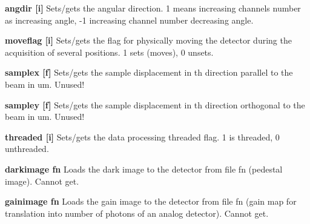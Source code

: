 \begin{DoxyItemize}
\item {\bfseries angdir \mbox{[}i\mbox{]}} Sets/gets the angular direction. 1 means increasing channels number as increasing angle, -\/1 increasing channel number decreasing angle.
\end{DoxyItemize}


\begin{DoxyItemize}
\item {\bfseries moveflag \mbox{[}i\mbox{]}} Sets/gets the flag for physically moving the detector during the acquisition of several positions. 1 sets (moves), 0 unsets.
\end{DoxyItemize}


\begin{DoxyItemize}
\item {\bfseries samplex \mbox{[}f\mbox{]}} Sets/gets the sample displacement in th direction parallel to the beam in um. Unused!
\end{DoxyItemize}


\begin{DoxyItemize}
\item {\bfseries sampley \mbox{[}f\mbox{]}} Sets/gets the sample displacement in th direction orthogonal to the beam in um. Unused!
\end{DoxyItemize}


\begin{DoxyItemize}
\item {\bfseries threaded \mbox{[}i\mbox{]}} Sets/gets the data processing threaded flag. 1 is threaded, 0 unthreaded.
\end{DoxyItemize}


\begin{DoxyItemize}
\item {\bfseries darkimage fn} Loads the dark image to the detector from file fn (pedestal image). Cannot get.
\end{DoxyItemize}


\begin{DoxyItemize}
\item {\bfseries gainimage fn} Loads the gain image to the detector from file fn (gain map for translation into number of photons of an analog detector). Cannot get. 
\end{DoxyItemize}